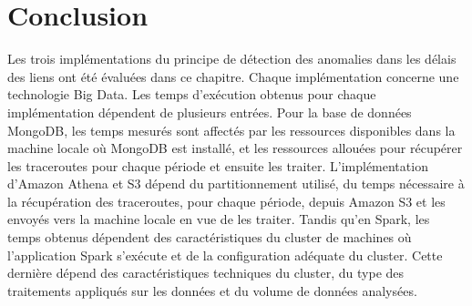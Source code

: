 





\section{Conclusion}

Les trois implémentations du principe de détection des anomalies dans les délais des liens ont été évaluées dans ce chapitre. Chaque implémentation  concerne une technologie Big Data. Les temps d'exécution obtenus pour chaque implémentation dépendent de plusieurs entrées. Pour la base de données  MongoDB, les temps  mesurés sont affectés par les ressources disponibles dans la machine locale où MongoDB est installé, et les ressources allouées pour récupérer les traceroutes pour chaque période et ensuite les traiter. L'implémentation d'Amazon Athena et S3 dépend du partitionnement utilisé, du temps nécessaire à la récupération des traceroutes, pour chaque période,  depuis Amazon S3 et les envoyés vers la machine locale en vue de les traiter. Tandis qu'en Spark, les temps obtenus dépendent des caractéristiques du cluster de machines où l'application Spark s'exécute et de la configuration adéquate du cluster. Cette dernière dépend des caractéristiques techniques du cluster, du type des traitements appliqués sur les données et du volume de données   analysées.













